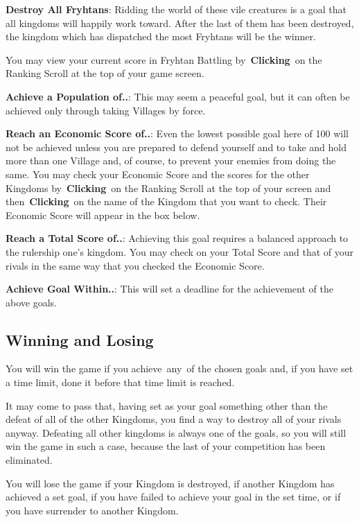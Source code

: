 \textbf{Destroy All Fryhtans}: Ridding the world of these vile creatures is a goal that all kingdoms will happily work toward. After the last of them has been destroyed, the kingdom which has dispatched the most Fryhtans will be the winner.

You may view your current score in Fryhtan Battling by \textbf{Clicking} on the Ranking Scroll at the top of your game screen.

\textbf{Achieve a Population of..}: This may seem a peaceful goal, but it can often be achieved only through taking Villages by force.

\textbf{Reach an Economic Score of..}: Even the lowest possible goal here of 100 will not be achieved unless you are prepared to defend yourself and to take and hold more than one Village and, of course, to prevent your enemies from doing the same. You may check your Economic Score and the scores for the other Kingdoms by \textbf{Clicking} on the Ranking Scroll at the top of your screen and then \textbf{Clicking} on the name of the Kingdom that you want to check. Their Economic Score will appear in the box below.

\textbf{Reach a Total Score of..}: Achieving this goal requires a balanced approach to the rulership one’s kingdom. You may check on your Total Score and that of your rivals in the same way that you checked the Economic Score.

\textbf{Achieve Goal Within..}: This will set a deadline for the achievement of the above goals.

\subsection{Winning and Losing}

You will win the game if you achieve any of the chosen goals and, if you have set a time limit, done it before that time limit is reached.

It may come to pass that, having set as your goal something other than the defeat of all of the other Kingdoms, you find a way to destroy all of your rivals anyway. Defeating all other kingdoms is always one of the goals, so you will still win the game in such a case, because the last of your competition has been eliminated.

You will lose the game if your Kingdom is destroyed, if another Kingdom has achieved a set goal, if you have failed to achieve your goal in the set time, or if you have surrender to another Kingdom.

